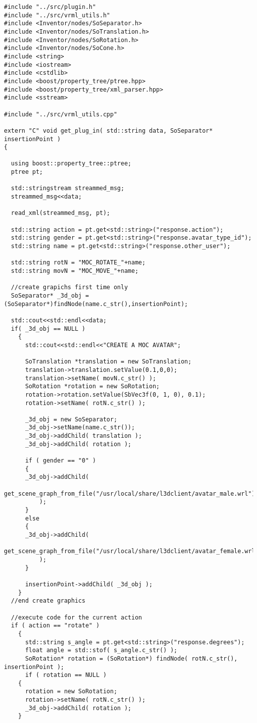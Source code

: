 \begin{verbatim}
#include "../src/plugin.h"
#include "../src/vrml_utils.h"
#include <Inventor/nodes/SoSeparator.h>
#include <Inventor/nodes/SoTranslation.h>
#include <Inventor/nodes/SoRotation.h>
#include <Inventor/nodes/SoCone.h>
#include <string>
#include <iostream>
#include <cstdlib>
#include <boost/property_tree/ptree.hpp>
#include <boost/property_tree/xml_parser.hpp>
#include <sstream>

#include "../src/vrml_utils.cpp"

extern "C" void get_plug_in( std::string data, SoSeparator* insertionPoint )
{

  using boost::property_tree::ptree;
  ptree pt;

  std::stringstream streammed_msg;
  streammed_msg<<data;

  read_xml(streammed_msg, pt);

  std::string action = pt.get<std::string>("response.action");
  std::string gender = pt.get<std::string>("response.avatar_type_id");
  std::string name = pt.get<std::string>("response.other_user");
 
  std::string rotN = "MOC_ROTATE_"+name;
  std::string movN = "MOC_MOVE_"+name;
 
  //create grapichs first time only
  SoSeparator* _3d_obj = (SoSeparator*)findNode(name.c_str(),insertionPoint);

  std::cout<<std::endl<<data;
  if( _3d_obj == NULL )
    {
      std::cout<<std::endl<<"CREATE A MOC AVATAR";

      SoTranslation *translation = new SoTranslation;
      translation->translation.setValue(0.1,0,0);
      translation->setName( movN.c_str() );
      SoRotation *rotation = new SoRotation;
      rotation->rotation.setValue(SbVec3f(0, 1, 0), 0.1);
      rotation->setName( rotN.c_str() );

      _3d_obj = new SoSeparator;
      _3d_obj->setName(name.c_str());
      _3d_obj->addChild( translation );
      _3d_obj->addChild( rotation );

      if ( gender == "0" )
	  {
	  _3d_obj->addChild(
	      get_scene_graph_from_file("/usr/local/share/l3dclient/avatar_male.wrl")
	      );
	  }
      else
	  {
	  _3d_obj->addChild( 
	      get_scene_graph_from_file("/usr/local/share/l3dclient/avatar_female.wrl")
	      );
	  }

      insertionPoint->addChild( _3d_obj );
    }
  //end create graphics

  //execute code for the current action
  if ( action == "rotate" )
    {
      std::string s_angle = pt.get<std::string>("response.degrees");
      float angle = std::stof( s_angle.c_str() );
      SoRotation* rotation = (SoRotation*) findNode( rotN.c_str(), insertionPoint );
      if ( rotation == NULL )
	{
	  rotation = new SoRotation;
	  rotation->setName( rotN.c_str() );
	  _3d_obj->addChild( rotation );
	}


\end{verbatim}

